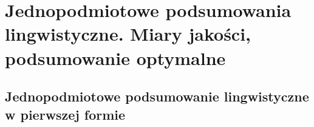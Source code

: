 \documentclass{classrep}
\begin{document}




\section{ Jednopodmiotowe podsumowania lingwistyczne. Miary jakości, podsumowanie optymalne}

\subsection{Jednopodmiotowe podsumowanie lingwistyczne w pierwszej formie}
\end{document}

